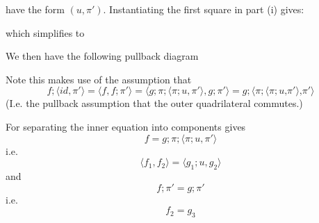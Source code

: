 \documentclass{article}
\begin{document}
have the form $(u,\pi')$. Instantiating the first square in part (i) gives:
\begin{center}
\end{center}
which simplifies to
\begin{center}
\end{center}
We then have the following pullback diagram

\begin{center}
\end{center}
Note this makes use of the assumption that 
$$f;\langle id, \pi' \rangle = \langle f, f;\pi' \rangle = \langle g;\pi;\langle \pi;u, \pi' \rangle, g;\pi' \rangle
= g;\langle \pi; \langle \pi;u \text{,} \pi' \rangle \text{,} \pi' \rangle$$
(I.e. the pullback assumption that the outer quadrilateral commutes.) 

For separating the inner equation into components gives
$$f = g;\pi;\langle \pi;u, \pi' \rangle $$
i.e.
$$\langle f_1, f_2 \rangle = \langle g_1;u, g_2 \rangle$$
and
$$f;\pi' = g ; \pi'$$
i.e.
$$f_2 = g_3$$
\end{document}
